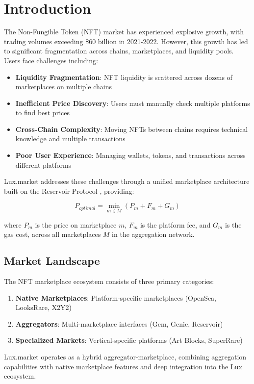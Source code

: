 \section{Introduction}


The Non-Fungible Token (NFT) market has experienced explosive growth, with trading volumes exceeding \$60 billion in 2021-2022. However, this growth has led to significant fragmentation across chains, marketplaces, and liquidity pools. Users face challenges including:

\begin{itemize}
\item \textbf{Liquidity Fragmentation}: NFT liquidity is scattered across dozens of marketplaces on multiple chains
\item \textbf{Inefficient Price Discovery}: Users must manually check multiple platforms to find best prices
\item \textbf{Cross-Chain Complexity}: Moving NFTs between chains requires technical knowledge and multiple transactions
\item \textbf{Poor User Experience}: Managing wallets, tokens, and transactions across different platforms
\end{itemize}

Lux.market addresses these challenges through a unified marketplace architecture built on the Reservoir Protocol \cite{reservoir2023}, providing:

\begin{equation}
P_{optimal} = \min_{m \in M} \left( P_m + F_m + G_m \right)
\end{equation}

where $P_m$ is the price on marketplace $m$, $F_m$ is the platform fee, and $G_m$ is the gas cost, across all marketplaces $M$ in the aggregation network.

\subsection{Market Landscape}

The NFT marketplace ecosystem consists of three primary categories:

\begin{enumerate}
\item \textbf{Native Marketplaces}: Platform-specific marketplaces (OpenSea, LooksRare, X2Y2)
\item \textbf{Aggregators}: Multi-marketplace interfaces (Gem, Genie, Reservoir)
\item \textbf{Specialized Markets}: Vertical-specific platforms (Art Blocks, SuperRare)
\end{enumerate}

Lux.market operates as a hybrid aggregator-marketplace, combining aggregation capabilities with native marketplace features and deep integration into the Lux ecosystem.

